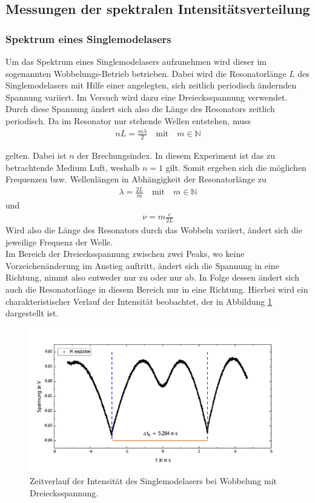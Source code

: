 \documentclass[a4paper,twoside,final]{article}
\begin{document}
\subsection{Messungen der spektralen Intensitätsverteilung}
\subsubsection{Spektrum eines Singlemodelasers}
Um das Spektrum eines Singlemodelasers aufzunehmen wird dieser im sogenannten Wobbelungs-Betrieb betrieben. Dabei wird die Resonatorlänge $L$ des Singlemodelasers mit Hilfe einer angelegten, sich zeitlich periodisch ändernden Spannung variiert. Im Versuch wird dazu eine Dreiecksspannung verwendet. Durch diese Spannung ändert sich also die Länge des Resonators zeitlich periodisch. Da im Resonator nur stehende Wellen entstehen, muss
\begin{align}
  nL = \frac{m\lambda}{2}\quad \text{mit} \quad m \in \mathbb{N}
\end{align}

gelten. Dabei ist $n$ der Brechungsindex.
In diesem Experiment ist das zu betrachtende Medium Luft, weshalb $n=1$ gilt. Somit ergeben sich die möglichen Frequenzen bzw. Wellenlängen in Abhängigkeit der Resonatorlänge zu
\begin{align}
  \lambda = \frac{2L}{m}\quad \text{mit} \quad m \in \mathbb{N}
\end{align}
und
\begin{align}
  \nu = m \frac{c}{2L}
\end{align}
Wird also die Länge des Resonators durch das Wobbeln variiert, ändert sich die jeweilige Frequenz der Welle. \\
Im Bereich der Dreiecksspannung zwischen zwei Peaks, wo keine Vorzeichenänderung im Anstieg auftritt, ändert sich die Spannung in eine Richtung, nimmt also entweder nur zu oder nur ab. In Folge dessen ändert sich auch die Resonatorlänge in diesem Bereich nur in eine Richtung. Hierbei wird ein charakteristischer Verlauf der Intensität beobachtet, der in Abbildung \ref{fig:Zeitverlauf} dargestellt ist.

\begin{figure}[htp]
    \centering
        \includegraphics[width=1\textwidth]{Bilder/Profil_SML_Zeitverlauf.pdf}
    \caption{Zeitverlauf der Intensität des Singlemodelasers bei Wobbelung mit Dreiecksspannung.}
    \label{fig:Zeitverlauf}
\end{figure}
\end{document}
